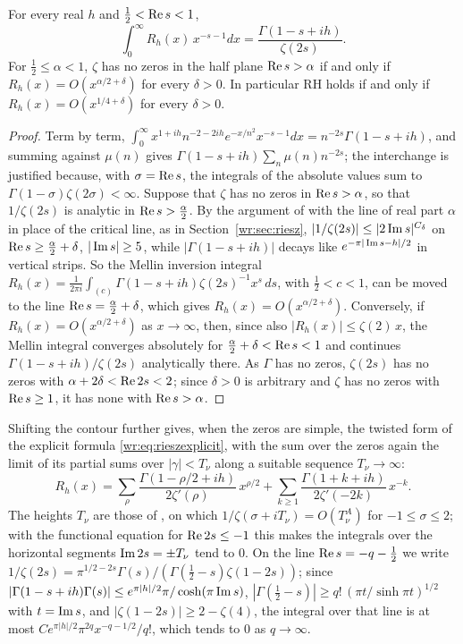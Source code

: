 \begin{proposition}\label{ri:prop:twisted}
For every real $h$ and $\frac12<\operatorname{Re} s<1$,
\[
\int_0^\infty R_h(x)\,x^{-s-1}dx=\frac{\Gamma(1-s+ih)}{\zeta(2s)} .
\]
For $\frac12\le\alpha<1$, $\zeta$ has no zeros in the half plane $\operatorname{Re} s>\alpha$ if and only if $R_h(x)=O(x^{\alpha/2+\delta})$ for every $\delta>0$. In particular RH holds if and only if $R_h(x)=O(x^{1/4+\delta})$ for every $\delta>0$.
\end{proposition}

\begin{proof}
Term by term, $\int_0^\infty x^{1+ih}n^{-2-2ih}e^{-x/n^2}x^{-s-1}dx=n^{-2s}\Gamma(1-s+ih)$, and summing against $\mu(n)$ gives $\Gamma(1-s+ih)\sum_n\mu(n)n^{-2s}$; the interchange is justified because, with $\sigma=\operatorname{Re} s$, the integrals of the absolute values sum to $\Gamma(1-\sigma)\zeta(2\sigma)<\infty$. Suppose that $\zeta$ has no zeros in $\operatorname{Re} s>\alpha$, so that $1/\zeta(2s)$ is analytic in $\operatorname{Re} s>\frac\alpha2$. By the argument of \cite[Section 14.2]{Titchmarsh} with the line of real part $\alpha$ in place of the critical line, as in Section~\ref{wr:sec:riesz}, $|1/\zeta(2s)|\le|2\operatorname{Im} s|^{C_\delta}$ on $\operatorname{Re} s\ge\frac\alpha2+\delta$, $|\operatorname{Im} s|\ge5$, while $|\Gamma(1-s+ih)|$ decays like $e^{-\pi|\operatorname{Im} s-h|/2}$ in vertical strips. So the Mellin inversion integral $R_h(x)=\frac1{2\pi i}\int_{(c)}\Gamma(1-s+ih)\zeta(2s)^{-1}x^s\,ds$, with $\frac12<c<1$, can be moved to the line $\operatorname{Re} s=\frac\alpha2+\delta$, which gives $R_h(x)=O(x^{\alpha/2+\delta})$. Conversely, if $R_h(x)=O(x^{\alpha/2+\delta})$ as $x\to\infty$, then, since also $|R_h(x)|\le\zeta(2)\,x$, the Mellin integral converges absolutely for $\frac\alpha2+\delta<\operatorname{Re} s<1$ and continues $\Gamma(1-s+ih)/\zeta(2s)$ analytically there. As $\Gamma$ has no zeros, $\zeta(2s)$ has no zeros with $\alpha+2\delta<\operatorname{Re}2s<2$; since $\delta>0$ is arbitrary and $\zeta$ has no zeros with $\operatorname{Re} s\ge1$, it has none with $\operatorname{Re} s>\alpha$.
\end{proof}

Shifting the contour further gives, when the zeros are simple, the twisted form of the explicit formula \eqref{wr:eq:rieszexplicit}, with the sum over the zeros again the limit of its partial sums over $|\gamma|<T_\nu$ along a suitable sequence $T_\nu\to\infty$:
\begin{equation}\label{ri:eq:twexplicit}
R_h(x)=\sum_\rho\frac{\Gamma(1-\rho/2+ih)}{2\zeta'(\rho)}\,x^{\rho/2}+\sum_{k\ge1}\frac{\Gamma(1+k+ih)}{2\zeta'(-2k)}\,x^{-k}.
\end{equation}
The heights $T_\nu$ are those of \cite[Theorem 9.7]{Titchmarsh}, on which $1/\zeta(\sigma+iT_\nu)=O(T_\nu^A)$ for $-1\le\sigma\le2$; with the functional equation for $\operatorname{Re}2s\le-1$ this makes the integrals over the horizontal segments $\operatorname{Im}2s=\pm T_\nu$ tend to $0$. On the line $\operatorname{Re} s=-q-\frac12$ we write $1/\zeta(2s)=\pi^{1/2-2s}\Gamma(s)/(\Gamma(\frac12-s)\zeta(1-2s))$; since $|\Gamma(1-s+ih)\Gamma(s)|\le e^{\pi|h|/2}\pi/\cosh(\pi\operatorname{Im} s)$, $|\Gamma(\frac12-s)|\ge q!\,(\pi t/\sinh\pi t)^{1/2}$ with $t=\operatorname{Im} s$, and $|\zeta(1-2s)|\ge2-\zeta(4)$, the integral over that line is at most $Ce^{\pi|h|/2}\pi^{2q}x^{-q-1/2}/q!$, which tends to $0$ as $q\to\infty$.

